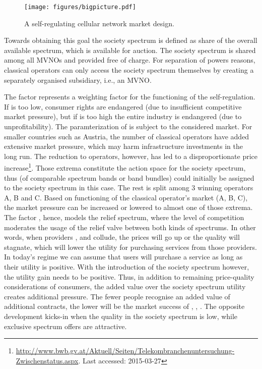 \documentclass[conference]{IEEEtran}
\begin{document}
\begin{figure}[htbp]
\centering
\texttt{[image: figures/bigpicture.pdf]}
\caption{A self-regulating cellular network market design.}
\label{fig:big_picture}
\end{figure}

	Towards obtaining this goal the society spectrum is defined as share  of the overall available spectrum, which is available for auction. The society spectrum is shared among all MVNOs   and provided free of charge. For separation of powers reasons, classical operators can only access the society spectrum themselves by creating a separately organised subsidiary, i.e., an MVNO. 
	
	The factor  represents a weighting factor for the functioning of the self-regulation. If  is too low, consumer rights are endangered (due to insufficient competitive market pressure), but if  is too high the entire industry is endangered (due to unprofitability). The paramterization of  is subject to the considered market. For smaller countries such as Austria, the number of  classical operators have added extensive market pressure, which may harm infrastructure investments in the long run. The reduction to  operators, however, has led to a disproportionate price increase\footnote{\url{http://www.bwb.gv.at/Aktuell/Seiten/Telekombranchenuntersuchung-Zwischenstatus.aspx}. Last accessed: 2015-03-27}. Those extrema constitute the action space for the society spectrum, thus  (of comparable spectrum bands or band bundles) could initially be assigned to the society spectrum in this case. The rest is split among 3 winning operators A, B and C. Based on functioning of the classical operator's market (A, B, C), the market pressure can be increased or lowered to almost one of those extrema. The factor , hence, models the relief spectrum, where the level of competition moderates the usage of the relief valve between both kinds of spectrums. In other words, when providers ,  and  collude, the prices will go up or the quality will stagnate, which will lower the utility  for purchasing services from those providers. In today's regime we can assume that users will purchase a service as long as their utility  is positive. With the introduction of the society spectrum however, the utility gain  needs to be positive. Thus, in addition to remaining price-quality considerations of consumers, the added value over the society spectrum utility  creates additional pressure. The fewer people recognise an added value of additional contracts, the lower will be the market success of , , . The opposite development kicks-in when the quality in the society spectrum is low, while exclusive spectrum offers are attractive.
	
\end{document}
